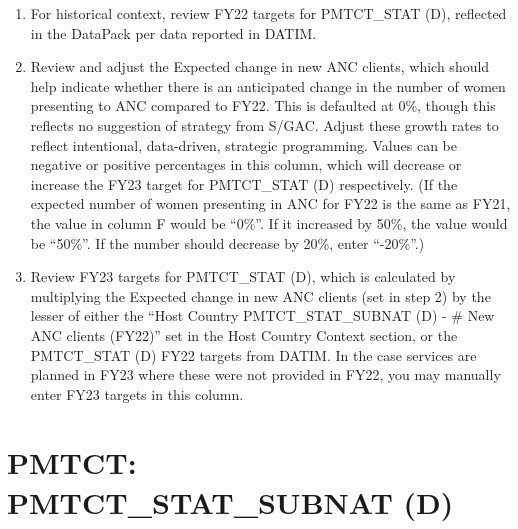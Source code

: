 \documentclass[
  openany]{book}
\begin{document}
\begin{enumerate}
\def\labelenumi{\arabic{enumi}.}
\item
  For historical context, review FY22 targets for PMTCT\_STAT (D),
  reflected in the DataPack per data reported in DATIM.
\item
  Review and adjust the Expected change in new ANC clients, which
  should help indicate whether there is an anticipated change in the
  number of women presenting to ANC compared to FY22. This is
  defaulted at 0\%, though this reflects no suggestion of strategy from
  S/GAC. Adjust these growth rates to reflect intentional,
  data-driven, strategic programming. Values can be negative or
  positive percentages in this column, which will decrease or increase
  the FY23 target for PMTCT\_STAT (D) respectively. (If the expected
  number of women presenting in ANC for FY22 is the same as FY21, the
  value in column F would be ``0\%''. If it increased by 50\%, the value
  would be ``50\%''. If the number should decrease by 20\%, enter ``-20\%''.)
\item
  Review FY23 targets for PMTCT\_STAT (D), which is calculated by
  multiplying the Expected change in new ANC clients (set in step 2)
  by the lesser of either the ``Host Country PMTCT\_STAT\_SUBNAT (D) - \#
  New ANC clients (FY22)'' set in the Host Country Context section, or
  the PMTCT\_STAT (D) FY22 targets from DATIM. In the case services are
  planned in FY23 where these were not provided in FY22, you may
  manually enter FY23 targets in this column.
\end{enumerate}

\hypertarget{pmtct-pmtct_stat_subnat-d}{%
\section{PMTCT: PMTCT\_STAT\_SUBNAT (D)}\label{pmtct-pmtct_stat_subnat-d}}
\end{document}
